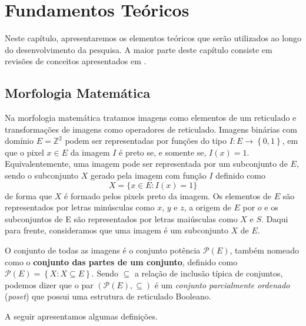 
\chapter{Fundamentos Teóricos}

Neste capítulo, apresentaremos os elementos teóricos que serão utilizados ao longo do desenvolvimento da pesquisa. A maior parte deste capítulo consiste em revisões de conceitos apresentados em \cite{BARRERA:04,BARRERA:03,BARRERA:02,NINA:02,DIEGO:01,NINA:01}.


\section{Morfologia Matemática}
\label{sec:mm}

Na morfologia matemática tratamos imagens como elementos de um reticulado e transformações de imagens como operadores de reticulado. Imagens binárias com domínio $E = \mathbb{Z}^{2}$ podem ser representadas por funções do tipo $I: E \rightarrow \left\{0,1\right\}$, em que o pixel $x \in E$ da imagem $I$ é preto se, e somente se, $I(x) = 1$. Equivalentemente, uma imagem pode ser representada por um subconjunto de $E$, sendo o subconjunto $X$ gerado pela imagem com função $I$ definido como
\begin{equation*}
    X = \{x \in E: I(x) = 1\}
\end{equation*}
de forma que $X$ é formado pelos pixels preto da imagem. Os elementos de $E$ são representados por letras minúsculas como $x$, $y$ e $z$, a origem de $E$ por $o$ e os subconjuntos de E são representados por letras maiúsculas como $X$ e $S$. Daqui para frente, consideramos que uma imagem é um subconjunto $X$ de $E$.

O conjunto de todas as imagens é o conjunto potência $\mathcal{P}\left(E\right)$, também nomeado como o \textbf{conjunto das partes de um conjunto}, definido como $\mathcal{P}\left(E\right)=\left\{X:X \subseteq E\right\}$. Sendo $\subseteq$ a relação de inclusão típica de conjuntos, podemos dizer que o par $ \left( \mathcal{P}\left(E\right), \subseteq \right) $ é um \textit{conjunto parcialmente ordenado} (\textit{poset}) que possui uma estrutura de reticulado Booleano.

A seguir apresentamos algumas definições.

